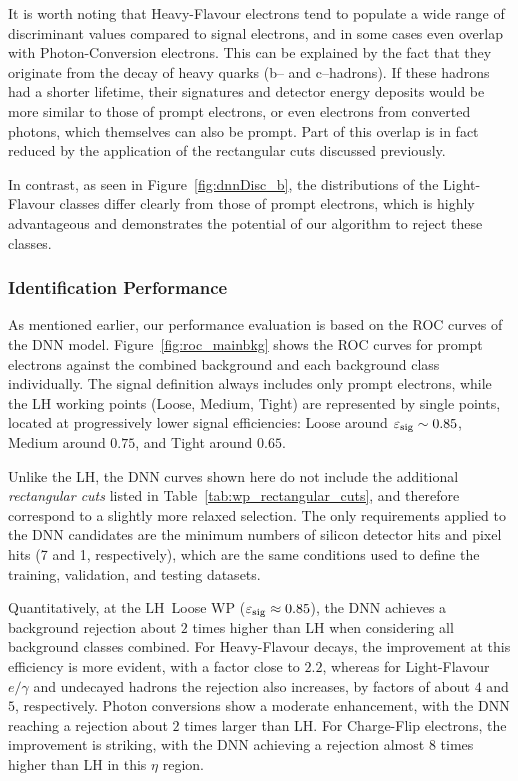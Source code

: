 It is worth noting that Heavy-Flavour electrons tend to populate a wide range of discriminant values compared to signal electrons, and in some cases even overlap with Photon-Conversion electrons. This can be explained by the fact that they originate from the decay of heavy quarks (b– and c–hadrons). If these hadrons had a shorter lifetime, their signatures and detector energy deposits would be more similar to those of prompt electrons, or even electrons from converted photons, which themselves can also be prompt. Part of this overlap is in fact reduced by the application of the rectangular cuts discussed previously.

In contrast, as seen in Figure~\ref{fig:dnnDisc_b}, the distributions of the Light-Flavour classes differ clearly from those of prompt electrons, which is highly advantageous and demonstrates the potential of our algorithm to reject these classes.

\subsubsection{Identification Performance}

As mentioned earlier, our performance evaluation is based on the ROC curves of the DNN model.
Figure~\ref{fig:roc_mainbkg} shows the ROC curves for prompt electrons against the combined background and each background class individually. The signal definition always includes only prompt electrons, while the LH working points (Loose, Medium, Tight) are represented by single points, located at progressively lower signal efficiencies: Loose around $\varepsilon_{\rm sig} \sim 0.85$, Medium around $0.75$, and Tight around $0.65$.

Unlike the LH, the DNN curves shown here do not include the additional \textit{rectangular cuts} listed in Table~\ref{tab:wp_rectangular_cuts}, and therefore correspond to a slightly more relaxed selection. The only requirements applied to the DNN candidates are the minimum numbers of silicon detector hits and pixel hits (7 and 1, respectively), which are the same conditions used to define the training, validation, and testing datasets.

Quantitatively, at the LH~Loose WP ($\varepsilon_{\rm sig} \approx 0.85$), the DNN achieves a background rejection about $2$ times higher than LH when considering all background classes combined. For Heavy-Flavour decays, the improvement at this efficiency is more evident, with a factor close to $2.2$, whereas for Light-Flavour $e/\gamma$ and undecayed hadrons the rejection also increases, by factors of about $4$ and $5$, respectively. Photon conversions show a moderate enhancement, with the DNN reaching a rejection about $2$ times larger than LH. For Charge-Flip electrons, the improvement is striking, with the DNN achieving a rejection almost $8$ times higher than LH in this $\eta$ region.

